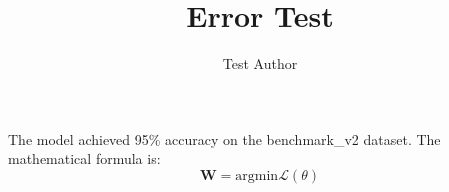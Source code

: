 \documentclass{article}
\begin{document}
\title{Error Test}
\author{Test Author}
\maketitle
The model achieved 95\% accuracy on the benchmark\_v2 dataset.
The mathematical formula is:
\begin{equation}
\boldsymbol{W} = \text{argmin} \mathcal{L}(\theta)
\end{equation}
\end{document}
